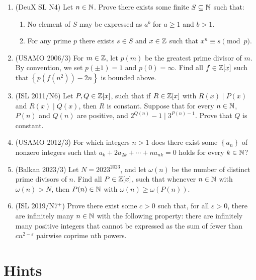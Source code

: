 \documentclass[11pt,paper=letter]{scrartcl}
\newcommand{\seq}[1]{\left\{#1\right\}}
\begin{document}
\begin{enumerate}[resume]

\item (DeuX SL N4) Let $n \in \mathbb N$. Prove there exists some finite $S \subseteq \mathbb N$ such that:
\begin{enumerate}
\item No element of $S$ may be expressed as $a^b$ for $a \ge 1$ and $b > 1$.
\item For any prime $p$ there exists $s \in S$ and $x \in \mathbb Z$ such that $x^n \equiv s \pmod p$. \hints{\ref{h:14a} \ref{h:14b}}
\end{enumerate}

\item (USAMO 2006/3) For $m \in \mathbb Z$, let $p(m)$ be the greatest prime divisor of $m$. By convention, we set $p(\pm 1) = 1$ and $p(0) = \infty$. Find all $f \in \mathbb Z[x]$ such that $\seq{p(f(n^2)) - 2n}$ is bounded above. \hints{\ref{h:15a} \ref{h:15b}}

\item (ISL 2011/N6) Let $P, Q \in \mathbb Z[x]$, such that if $R \in \mathbb Z[x]$ with $R(x) \mid P(x)$ and $R(x) \mid Q(x)$, then $R$ is constant. Suppose that for every $n \in \mathbb N$, $P(n)$ and $Q(n)$ are positive, and $2^{Q(n)} - 1 \mid 3^{P(n) - 1}$. Prove that $Q$ is constant. \hints{\ref{h:16a} \ref{h:16b}}

\item (USAMO 2012/3) For which integers $n > 1$ does there exist some $\seq{a_n}$ of nonzero integers such that $a_k + 2a_{2k} + \cdots + na_{nk} = 0$ holds for every $k \in \mathbb N$? \hints{\ref{h:17a} \ref{h:17b}}

\item (Balkan 2023/3) Let $N = 2023^{2023}$, and let $\omega(n)$ be the number of distinct prime divisors of $n$. Find all $P \in \mathbb Z[x]$, such that whenever $n \in \mathbb N$ with $\omega(n)>N$, then $P(n) \in \mathbb N$ with $\omega(n)\ge\omega(P(n))$. \hints{\ref{h:18a} \ref{h:18b} \ref{h:18c}}

\item (ISL 2019/N7$^+$) Prove there exist some $c > 0$ such that, for all $\varepsilon >0$, there are infinitely many $n \in \mathbb N$ with the following property: there are infinitely many positive integers that cannot be expressed as the sum of fewer than $cn^{2 - \varepsilon}$ pairwise coprime $n$th powers. \hints{\ref{h:19a} \ref{h:19b} \ref{h:19c}}
\end{enumerate}

\pagebreak
\section{Hints}
\end{document}

